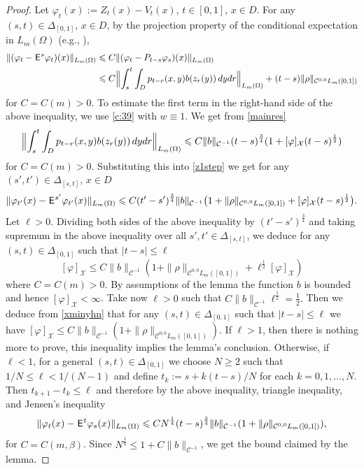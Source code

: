 \documentclass[12pt]{article}
\theoremstyle{definition}
\DeclareMathOperator{\1}{\mathbbm{1}}%
\def\E{\hskip.15ex\mathsf{E}\hskip.10ex}
\def\phi{\varphi}
\renewcommand{\ge}{\geqslant}
\renewcommand{\le}{\leqslant}
\newcommand{\nn}{\nonumber}
\newcommand{\C}{\mathcal{C}}
\newcommand{\X}{\mathcal{X}}
\begin{document}
\begin{proof}
Let $\phi_t(x):=Z_t(x)-V_t(x)$, $t\in[0,1]$, $x\in D$. 
For any $(s,t)\in\Delta_{[0,1]}$, ${x\in D}$, by  the projection property of the conditional expectation in $L_m(\Omega)$ (e.g., \cite[Lemma~4.2(i)]{BDGLevy}),
\begin{align}\label{z1step} 	
\|(\phi_t-\E^s \phi_t)(x)\|_{L_m(\Omega)}&\le C \|(\phi_t-P_{t-s}\phi_s)(x)\|_{L_m(\Omega)}\\
&\le  
C\Bigl\|\int_s^t\int_D p_{t-r}(x,y) b(z_r(y))\,dydr\Bigr\|_{L_m(\Omega)}+(t-s) \|\rho\|_{ \C^{0,0}L_m([0,1])}\nn 
\end{align}
for $C=C(m)>0$. 
To estimate the first term in the right-hand side of the above inequality, we use \cref{c:39} with $w\equiv1$. 
We get from \eqref{mainres} 
$$
\Bigl\|\int_s^t\int_D p_{t-r}(x,y) b(z_r(y))\,dydr\Bigr\|_{L_m(\Omega)}\le C \|b\|_{\C^{-1}} (t-s)^{\frac34}(1+[\phi]_{\X}(t-s)^{\frac12})
$$
for $C=C(m)>0$. 	
Substituting this into \eqref{z1step} we get for any $(s',t')\in\Delta_{[s,t]}$, $x\in D$
$$
\|\phi_{t'}(x)-\E^{s'}\phi_{t'}(x)\|_{L_m(\Omega)} \le  C(t'-s')^{\frac34}\|b\|_{\C^{-1}}\bigl(1+\|\rho\|_{\C^{0,0} L_m([0,1])}+[\phi]_{\X}(t-s)^{\frac12}\bigr).
$$ 
Let $\ell>0$. Dividing both sides of the above inequality by $(t'-s')^{\frac34}$ and taking supremum in the above inequality over all $s',t'\in \Delta_{[s,t]}$, we deduce for any $(s,t)\in\Delta_{[0,1]}$ such that $|t-s|\le \ell$
\begin{equation}\label{xminyhn}
[\phi]_{\X}\le  C \|b\|_{\C^{-1}} (1+\|\rho\|_{\C^{0,0} L_m([0,1])}+ \ell^{\frac12}	[\phi]_{\X}) 
\end{equation}	
where $C=C(m)>0$.  By assumptions of the lemma the function $b$ is bounded and hence  $[\phi]_{\X}<\infty$. 
Take now $\ell>0$ such that 
$
C  \|b\|_{\C^{-1}}
\ell^{\frac12}=\frac12.
$
Then we deduce from  \eqref{xminyhn} that for any $(s,t)\in\Delta_{[0,1]}$ such that $|t-s|\le \ell$ we have 
$[\phi]_{\X}\le C\|b\|_{\C^{-1}} (1+\|\rho\|_{\C^{0,0} L_m([0,1])}).$
If $\ell>1$, then there is nothing more to prove, this inequality
implies the lemma's conclusion. Otherwise, if $\ell<1$, for a general $(s,t)\in\Delta_{[0,1]}$ we choose $N\ge2$ such that $1/N\le \ell < 1/(N-1)$
and define $t_k:=s+k(t-s)/N$ for each $k=0,1,\hdots, N$. Then $t_{k+1}-t_k\le \ell$ and therefore by the above inequality, triangle inequality, and Jensen's inequality 
$$\|\phi_t(x)-\E^t \phi_s(x)\|_{L_m(\Omega)}
\le C N^{\frac14} (t-s)^{\frac34} \|b\|_{\C^{-1}}  (1+\|\rho\|_{\C^{0,0} L_m([0,1])}),
$$ 
for $C=C(m,\beta)$. 	Since $N^{\frac14}\le 1 + C \|b\|_{\C^{-1}}$,
we get the bound claimed by the lemma. 
\end{proof}
\end{document}
